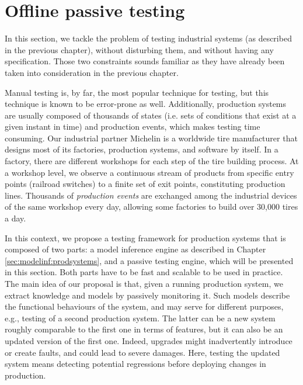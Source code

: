 \section{Offline passive testing}
\label{sec:testing:offpassive}

In this section, we tackle the problem of testing industrial
systems (as described in the previous chapter), without
disturbing them, and without having any specification. Those two
constraints sounds familiar as they have already been taken into
consideration in the previous chapter.

Manual testing is, by far, the most popular technique for
testing, but this technique is known to be error-prone as well.
Additionally, production systems are usually composed of
thousands of states (i.e. sets of conditions that exist at a
given instant in time) and production events, which makes
testing time consuming. Our industrial partner Michelin is a
worldwide tire manufacturer that designs most of its factories,
production systems, and software by itself. In a factory, there
are different workshops for each step of the tire building
process. At a workshop level, we observe a continuous stream of
products from specific entry points (railroad switches) to a
finite set of exit points, constituting production lines.
Thousands of \emph{production events} are exchanged among the
industrial devices of the same workshop every day, allowing some
factories to build over 30,000 tires a day.

In this context, we propose a testing framework for production
systems that is composed of two parts: a model inference engine
as described in Chapter \ref{sec:modelinf:prodsystems}, and a
passive testing engine, which will be presented in this section.
Both parts have to be fast and scalable to be used in practice.
The main idea of our proposal is that, given a running production
system, we extract knowledge and models by passively monitoring
it. Such models describe the functional behaviours of the system,
and may serve for different purposes, e.g., testing of a second
production system. The latter can be a new system roughly
comparable to the first one in terms of features, but it can also
be an updated version of the first one. Indeed, upgrades might
inadvertently introduce or create faults, and could lead to
severe damages. Here, testing the updated system means detecting
potential regressions before deploying changes in production.

